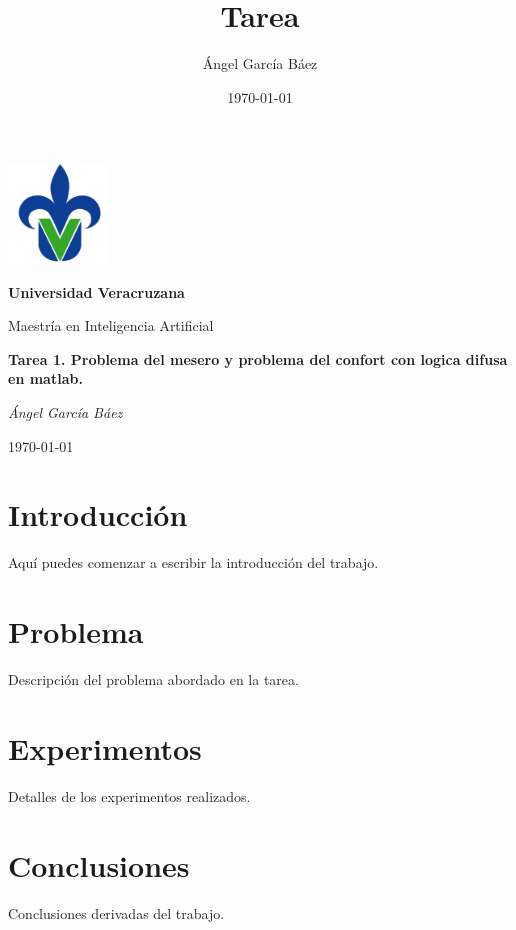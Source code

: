 \documentclass[11pt, letterpaper]{article}
\title{\bfseries Tarea}
\author{Ángel García Báez}
\date{\today}
\begin{document}
	
	\begin{titlepage}
		\centering
		\includegraphics[width=0.2\textwidth]{logo.png}\par
		\vspace{1cm}
		{\LARGE \bfseries Universidad Veracruzana \par}
		\vspace{1cm}
		{\Large Maestría en Inteligencia Artificial\par}
		\vspace{3cm}
		{\Large \bfseries Tarea 1. Problema del mesero y problema del confort con logica difusa en matlab. \par}
		\vfill
		{\Large \textit{Ángel García Báez}\par}
		\vfill
		{\Large \today \par}
	\end{titlepage}
	
	\newpage
	\tableofcontents
	\newpage
	
	\section{Introducción}
	Aquí puedes comenzar a escribir la introducción del trabajo.
	
	\section{Problema}
	Descripción del problema abordado en la tarea.
	
	\section{Experimentos}
	Detalles de los experimentos realizados.
	
	\section{Conclusiones}
	Conclusiones derivadas del trabajo.
	
\end{document}
